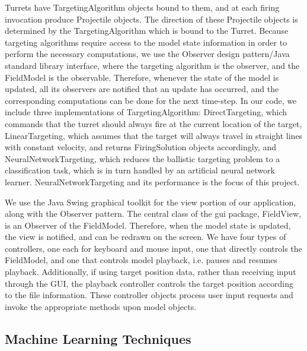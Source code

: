 \documentclass[11pt,letterpaper]{article}
\begin{document}
Turrets have TargetingAlgorithm objects bound to them, and at each firing invocation produce Projectile objects. The direction of these Projectile objects is determined by the TargetingAlgorithm which is bound to the Turret. Because targeting algorithms require access to the model state information in order to perform the necessary computations, we use the Observer design pattern/Java standard library interface, where the targeting algorithm is the observer, and the FieldModel is the observable. Therefore, whenever the state of the model is updated, all its observers are notified that an update has occurred, and the corresponding computations can be done for the next time-step. In our code, we include three implementations of TargetingAlgorithm: DirectTargeting, which commands that the turret should always fire at the current location of the target, LinearTargeting, which assumes that the target will always travel in straight lines with constant velocity, and returns FiringSolution objects accordingly, and NeuralNetworkTargeting, which reduces the ballistic targeting problem to a classification task, which is in turn handled by an artificial neural network learner. NeuralNetworkTargeting and its performance is the focus of this project.

We use the Java Swing graphical toolkit for the view portion of our application, along with the Observer pattern. The central class of the gui package, FieldView, is an Observer of the FieldModel. Therefore, when the model state is updated, the view is notified, and can be redrawn on the screen.
We have four types of controllers, one each for keyboard and mouse input, one that directly controls the FieldModel, and one that controls model playback, i.e. pauses and resumes playback. Additionally, if using target position data, rather than receiving input through the GUI, the playback controller controls the target position according to the file information. These controller objects process user input requests and invoke the appropriate methods upon model objects.

\subsection{Machine Learning Techniques}
\end{document}
